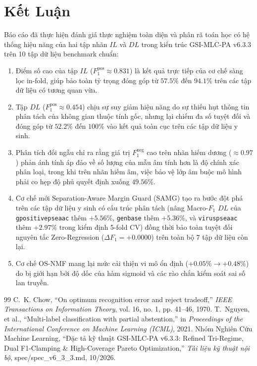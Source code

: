 \documentclass[10pt,a4paper]{article}
\begin{document}
\section{Kết Luận}

Báo cáo đã thực hiện đánh giá thực nghiệm toàn diện và phân rã toán học có hệ thống hiệu năng của hai tập nhãn $IL$ và $DL$ trong kiến trúc GSI-MLC-PA v6.3.3 trên 10 tập dữ liệu benchmark chuẩn:
\begin{enumerate}[leftmargin=*]
    \item Điểm số cao của tập $IL$ ($F_1^{\text{pos}} \approx 0.831$) là kết quả trực tiếp của cơ chế sàng lọc in-fold, giúp bảo toàn tỷ trọng đóng góp từ $57.5\%$ đến $94.1\%$ trên các tập dữ liệu có tương quan vừa.
    \item Tập $DL$ ($F_1^{\text{pos}} \approx 0.454$) chịu sự suy giảm hiệu năng do sự thiếu hụt thông tin phân tách của không gian thuộc tính gốc, nhưng lại chiếm đa số tuyệt đối và đóng góp từ $52.2\%$ đến $100\%$ vào kết quả toàn cục trên các tập dữ liệu y sinh.
    \item Phân tích đối ngẫu chỉ ra rằng giá trị $F_1^{\text{neg}}$ cao trên nhãn hiếm dương ($\approx 0.97$) phản ánh tính áp đảo về số lượng của mẫu âm tính hơn là độ chính xác phân loại, trong khi trên nhãn hiếm âm, việc bảo vệ lớp âm buộc mô hình phải co hẹp độ phủ quyết định xuống $49.56\%$.
    \item Cơ chế mới Separation-Aware Margin Guard (SAMG) tạo ra bước đột phá trên các tập dữ liệu y sinh có cấu trúc phân tách (nâng Macro-$F_1$ $DL$ của \texttt{gpositivepseaac} thêm $+5.56\%$, \texttt{genbase} thêm $+5.36\%$, và \texttt{viruspseaac} thêm $+2.97\%$ trong kiểm định 5-fold CV) đồng thời bảo toàn tuyệt đối nguyên tắc Zero-Regression ($\Delta F_1 = +0.0000$) trên toàn bộ 7 tập dữ liệu còn lại.
    \item Cơ chế OS-NMF mang lại mức cải thiện vi mô ổn định ($+0.05\% \to +0.48\%$) do bị giới hạn bởi độ dốc của hàm sigmoid và các rào chắn kiểm soát sai số lan truyền.
\end{enumerate}

\begin{thebibliography}{99}
 C.~K. Chow, ``On optimum recognition error and reject tradeoff,'' \emph{IEEE Transactions on Information Theory}, vol. 16, no. 1, pp. 41--46, 1970.
 T.~Nguyen, et al., ``Multi-label classification with partial abstention,'' in \emph{Proceedings of the International Conference on Machine Learning (ICML)}, 2021.
 Nhóm Nghiên Cứu Machine Learning, ``Đặc tả kỹ thuật GSI-MLC-PA v6.3.3: Refined Tri-Regime, Dual F1-Clamping \& High-Coverage Pareto Optimization,'' \emph{Tài liệu kỹ thuật nội bộ}, spec/spec\_v6\_3\_3.md, 10/2026.
\end{thebibliography}
\end{document}
